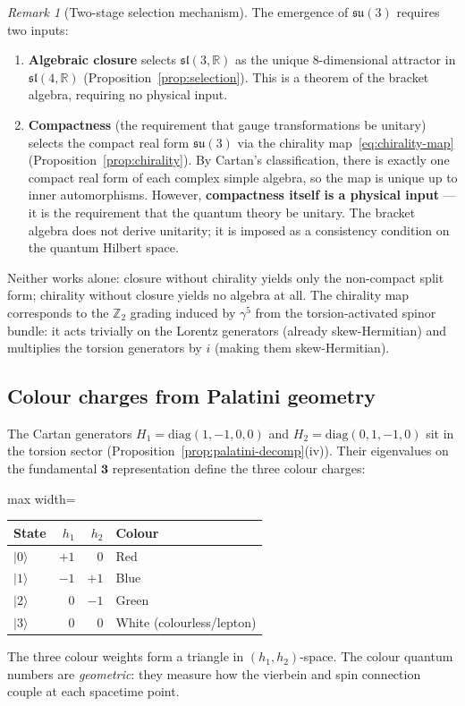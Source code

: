 \documentclass[11pt,a4paper]{article}
\theoremstyle{plain}
\theoremstyle{definition}
\theoremstyle{remark}
\newtheorem{remark}[theorem]{Remark}
\begin{document}
\begin{remark}[Two-stage selection mechanism]\label{rem:two-stage}
The emergence of $\mathfrak{su}(3)$ requires two inputs:
\begin{enumerate}[label=(\arabic*),noitemsep]
  \item \textbf{Algebraic closure} selects $\mathfrak{sl}(3,\mathbb{R})$ as the
    unique 8-dimensional attractor in $\mathfrak{sl}(4,\mathbb{R})$
    (Proposition~\ref{prop:selection}).  This is a theorem of the
    bracket algebra, requiring no physical input.
  \item \textbf{Compactness} (the requirement that gauge transformations
    be unitary) selects the compact real form $\mathfrak{su}(3)$
    via the chirality map~\eqref{eq:chirality-map}
    (Proposition~\ref{prop:chirality}).  By Cartan's classification,
    there is exactly one compact real form of each complex simple
    algebra, so the map is unique up to inner automorphisms.
    However, \textbf{compactness itself is a physical input} ---
    it is the requirement that the quantum theory be unitary.
    The bracket algebra does not derive unitarity; it is imposed as
    a consistency condition on the quantum Hilbert space.
\end{enumerate}
Neither works alone: closure without chirality yields only the non-compact
split form; chirality without closure yields no algebra at all.
The chirality map corresponds to the $\mathbb{Z}_2$ grading induced by
$\gamma^5$ from the torsion-activated spinor bundle: it acts trivially on the
Lorentz generators (already skew-Hermitian) and multiplies the torsion generators
by $i$ (making them skew-Hermitian).
\end{remark}

\subsection{Colour charges from Palatini geometry}

The Cartan generators $H_1 = \mathrm{diag}(1,-1,0,0)$ and
$H_2 = \mathrm{diag}(0,1,-1,0)$ sit in the torsion sector
(Proposition~\ref{prop:palatini-decomp}(iv)).
Their eigenvalues on the fundamental $\mathbf{3}$ representation
define the three colour charges:
\begin{center}
\begin{adjustbox}{max width=\linewidth}\begin{tabular}{lrrl}
\toprule
State & $h_1$ & $h_2$ & Colour \\
\midrule
$|0\rangle$ & $+1$ & $0$ & Red \\
$|1\rangle$ & $-1$ & $+1$ & Blue \\
$|2\rangle$ & $0$ & $-1$ & Green \\
$|3\rangle$ & $0$ & $0$ & White (colourless/lepton) \\
\bottomrule
\end{tabular}\end{adjustbox}
\end{center}
The three colour weights form a triangle in $(h_1, h_2)$-space.
The colour quantum numbers are \emph{geometric}: they measure
how the vierbein and spin connection couple at each spacetime point.
\end{document}
